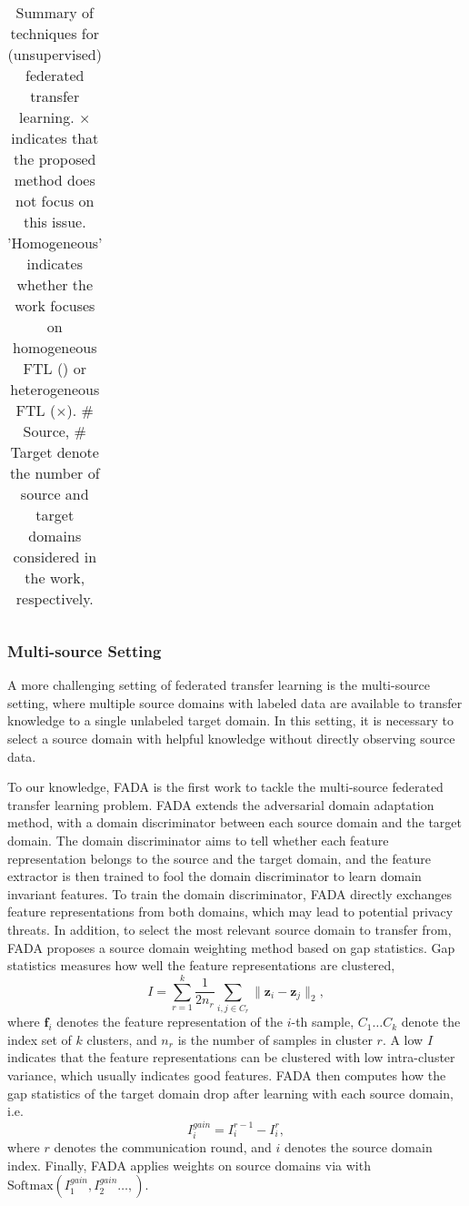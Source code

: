 \documentclass[11pt]{article}
\newcommand{\cmark}{\ding{51}}
\begin{document}
\begin{table}[t]
{\begin{tabular}{cccccccc}
    \bottomrule
    \end{tabular}}
    \caption{Summary of techniques for (unsupervised) federated transfer learning. $\times$ indicates that the proposed method does not focus on this issue. 'Homogeneous' indicates whether the work focuses on homogeneous FTL (\cmark) or heterogeneous FTL ($\times$). \# Source, \# Target denote the number of source and target domains considered in the work, respectively. }
    \label{tab:fed_utl}
\end{table}

\subsubsection{Multi-source Setting}
A more challenging setting of federated transfer learning is the multi-source setting, where multiple source domains with labeled data are available to transfer knowledge to a single unlabeled target domain. In this setting, it is necessary to select a source domain with helpful knowledge without directly observing source data. 

To our knowledge, FADA \cite{peng2020federated} is the first work to tackle the multi-source federated transfer learning problem. FADA extends the adversarial domain adaptation \cite{ganin2016domain} method, with a domain discriminator between each source domain and the target domain. The domain discriminator aims to tell whether each feature representation belongs to the source and the target domain, and the feature extractor is then trained to fool the domain discriminator to learn domain invariant features. To train the domain discriminator, FADA directly exchanges feature representations from both domains, which may lead to potential privacy threats. In addition, to select the most relevant source domain to transfer from, FADA proposes a source domain weighting method based on gap statistics. Gap statistics \cite{tibshirani2001estimating} measures how well the feature representations are clustered, 
\begin{equation}
    I = \sum_{r=1}^k\frac{1}{2n_r}\sum_{i, j\in C_r}\|\mathbf{z}_i-\mathbf{z}_j\|_2,
\end{equation}
where $\mathbf{f}_i$ denotes the feature representation of the $i$-th sample, $C_1\dots C_k$ denote the index set of $k$ clusters, and $n_r$ is the number of samples in cluster $r$. A low $I$ indicates that the feature representations can be clustered with low intra-cluster variance, which usually indicates good features. FADA then computes how the gap statistics of the target domain drop after learning with each source domain, i.e. 
\begin{equation}
    I_i^{gain} = I_i^{r-1}-I_i^{r}, 
\end{equation}
where $r$ denotes the communication round, and $i$ denotes the source domain index. Finally, FADA applies weights on source domains via with $\mathrm{Softmax}(I_1^{gain}, I_2^{gain}\dots, )$. 
\end{document}
